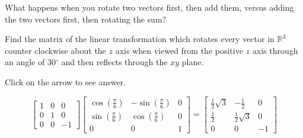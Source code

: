 \documentclass{ximera}
\begin{document}
\begin{problem}
\begin{hint}
\begin{center}
\end{center}
What happens when you rotate two vectors first, then add them, versus adding the two vectors first, then rotating the sum?  
\end{hint}
\end{problem}

\begin{problem}\label{prb:6.25} Find the matrix of the linear transformation which rotates every
vector in $\mathbb{R}^{3}$ counter clockwise about the $z$ axis when viewed
from the positive $z$ axis through an angle of 30$^{\circ }$ and then
reflects through the $xy$ plane.

Click on the arrow to see answer.
\begin{expandable}
\[
\left[
\begin{array}{rrr}
1 & 0 & 0 \\
0 & 1 & 0 \\
0 & 0 & -1
\end{array}
\right] \left[
\begin{array}{ccc}
\cos \left( \frac{\pi }{6}\right)  & -\sin \left( \frac{\pi }{6}\right)  & 0
\\
\sin \left( \frac{\pi }{6}\right)  & \cos \left( \frac{\pi }{6}\right)  & 0
\\
0 & 0 & 1
\end{array}
\right] = \left[
\begin{array}{ccc}
\frac{1}{2}\sqrt{3} & -\frac{1}{2} & 0 \\
\frac{1}{2} & \frac{1}{2}\sqrt{3} & 0 \\
0 & 0 & -1
\end{array}
\right]
\]
\end{expandable}
\end{problem}
\end{document}
